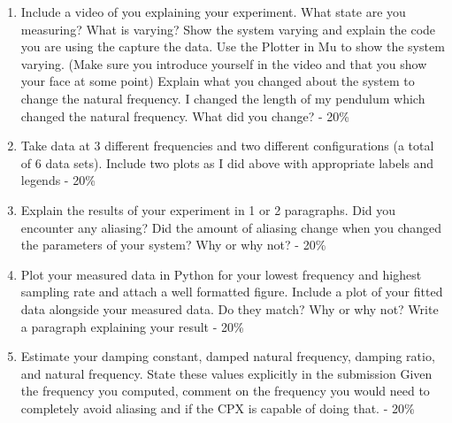 \begin{enumerate}[itemsep=-5pt]
\item Include a video of you explaining your experiment. What state are you measuring? What is varying? Show the system varying and explain the code you are using the capture the data. Use the Plotter in Mu to show the system varying. (Make sure you introduce yourself in the video and that you show your face at some point) Explain what you changed about the system to change the natural frequency. I changed the length of my pendulum which changed the natural frequency. What did you change? - 20\%
\item Take data at 3 different frequencies and two different configurations (a total of 6 data sets). Include two plots as I did above with appropriate labels and legends - 20\%
\item Explain the results of your experiment in 1 or 2 paragraphs. Did you encounter any aliasing? Did the amount of aliasing change when you changed the parameters of your system? Why or why not? - 20\%
\item Plot your measured data in Python for your lowest frequency and highest sampling rate and attach a well formatted figure. Include a plot of your fitted data alongside your measured data. Do they match? Why or why not? Write a paragraph explaining your result - 20\%
\item Estimate your damping constant, damped natural frequency, damping ratio, and natural frequency. State these values explicitly in the submission Given the frequency you computed, comment on the frequency you would need to completely avoid aliasing and if the CPX is capable of doing that. - 20\%
\end{enumerate}
